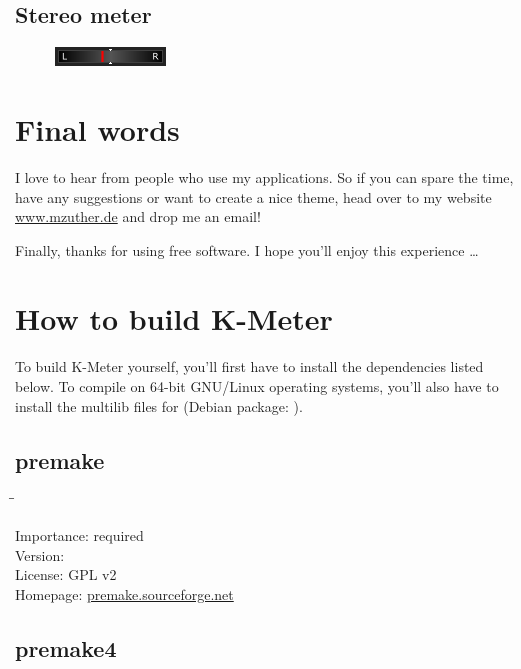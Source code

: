 \subsection{Stereo meter}

\begin{figure}[H]
  \centering{}
  \includegraphics[scale=\screenshotscale,clip]{include/images/stereo_meter.png}
\end{figure}

\section{Final words}

I love to hear from people who use my applications.  So if you can
spare the time, have any suggestions or want to create a nice theme,
head over to my website \href{http://www.mzuther.de/}{www.mzuther.de}
and drop me an email!

Finally, thanks for using free software.  I hope you'll enjoy this
experience \dots

\section{How to build K-Meter}

To build K-Meter yourself, you'll first have to install the
dependencies listed below.  To compile on 64-bit GNU/Linux operating
systems, you'll also have to install the multilib files for
 (Debian package: ).

\subsection{premake}

\begin{tabbing}
  \hspace*{6em}\=\=\kill

  Importance:  \> required \\
  Version:      \\
  License:     \> GPL v2 \\
  Homepage:    \> \href{http://premake.sourceforge.net/}{premake.sourceforge.net}
\end{tabbing}

\subsection{premake4}

